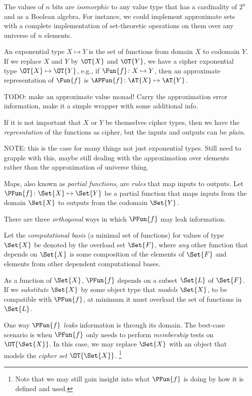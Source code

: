 \documentclass[ ../main.tex]{subfiles}
\begin{document}
The values of $n$ bits are \emph{isomorphic} to any value type that has a cardinality of $2^n$ and as a Boolean algebra.
For instance, we could implement approximate sets with a complete implementation of set-theoretic operations on them over any universe of $n$ elements.
	
An exponential type $X \mapsto Y$ is the set of functions from domain $X$ to codomain $Y$. If we replace $X$ and $Y$ by $\OT{X}$ and $\OT{Y}$, we have a cipher exponential type $\OT{X} \mapsto \OT{Y}$, e.g., if $\Fun{f} \colon X \mapsto Y$, then an approximate representation of $\Fun{f}$ is $\APFun{f} \colon \AT{X} \mapsto \AT{Y}$.

TODO: make an approximate value monad! Carry the approximation error information, make it a simple wrapper with some additional info.
	
If it is not important that $X$ or $Y$ be themselves cipher types, then we have the \emph{represntation} of the functions as cipher, but the inputs and outputs can be \emph{plain}.
	
NOTE: this is the case for many things not just exponential types. Still need to grapple with this, maybe still dealing with the approximation over elements rather than the approximation of universe thing.
	
	
	
	Maps, also known as \emph{partial functions}, are \emph{rules} that map inputs to outputs.
	Let $\PFun{f} \colon \Set{X} \mapsto \Set{Y}$ be a partial function that maps inputs from the domain $\Set{X}$ to outputs from the codomain $\Set{Y}$.
	
	There are three \emph{orthogonal} ways in which $\PFun{f}$ may leak information.
	
	Let the \emph{computational basis} (a minimal set of functions) for values of type $\Set{X}$ be denoted by the overload set $\Set{F}$, where \emph{any} other function that depends on $\Set{X}$ is some composition of the elements of $\Set{F}$ and elements from other dependent computational bases.
	
	As a function of $\Set{X}$, $\PFun{f}$ depends on a subset $\Set{L}$ of $\Set{F}$.
	If we \emph{substitute} $\Set{X}$ by some object type that \emph{models} $\Set{X}$, to be compatible with $\PFun{f}$, at minimum it must overload the set of functions in $\Set{L}$.
	
	One way $\PFun{f}$ \emph{leaks} information is through its domain.
	The best-case scenario is when $\PFun{f}$ only needs to perform \emph{membership} tests on $\OT{\Set{X}}$.
	In this case, we may replace $\Set{X}$ with an object that models the \emph{cipher set} $\OT{\Set{X}}$.
	\footnote{Note that we may still gain insight into what $\PFun{f}$ is doing by how it is defined and used.}
	
\end{document}
